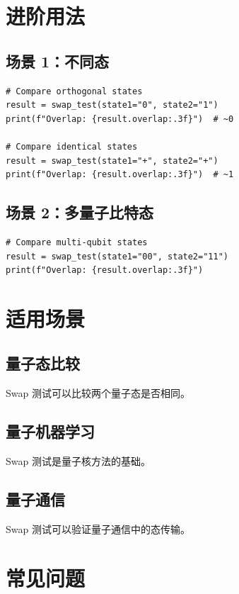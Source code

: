 \documentclass[12pt,a4paper]{article}
\begin{document}
\section{进阶用法}

\subsection{场景 1：不同态}

\begin{lstlisting}[style=python]
# Compare orthogonal states
result = swap_test(state1="0", state2="1")
print(f"Overlap: {result.overlap:.3f}")  # ~0

# Compare identical states
result = swap_test(state1="+", state2="+")
print(f"Overlap: {result.overlap:.3f}")  # ~1
\end{lstlisting}

\subsection{场景 2：多量子比特态}

\begin{lstlisting}[style=python]
# Compare multi-qubit states
result = swap_test(state1="00", state2="11")
print(f"Overlap: {result.overlap:.3f}")
\end{lstlisting}

\section{适用场景}

\subsection{量子态比较}

Swap 测试可以比较两个量子态是否相同。

\subsection{量子机器学习}

Swap 测试是量子核方法的基础。

\subsection{量子通信}

Swap 测试可以验证量子通信中的态传输。

\section{常见问题}
\end{document}

